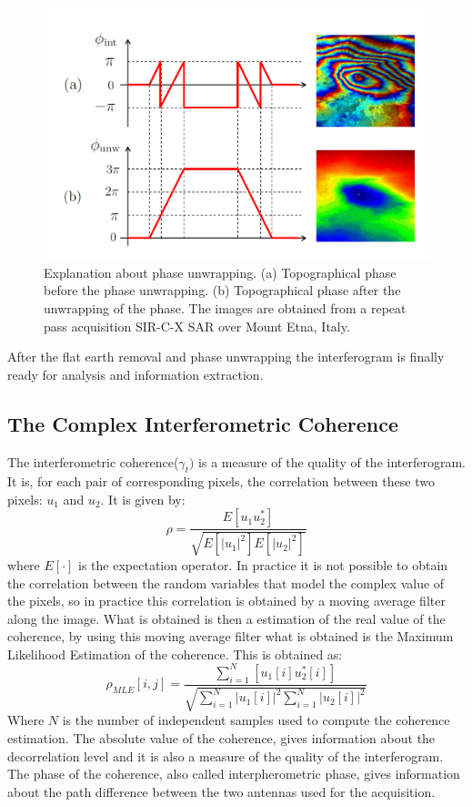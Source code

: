 \begin{figure}[H]
    \centering
    \includegraphics[width=\linewidth]{Cap1/unwr.png}
    \caption{Explanation about phase unwrapping. 
    (a) Topographical phase before the phase unwrapping.
    (b) Topographical phase after the unwrapping of the phase.
    The images are obtained from a repeat pass acquisition SIR-C-X SAR over Mount Etna, Italy. \cite{Paolathesis}}
    \label{fig:phase_unwrapping_process}
\end{figure}

After the flat earth removal and phase unwrapping the interferogram is finally ready for analysis and information extraction.

\subsection{The Complex Interferometric Coherence}
The interferometric coherence($\gamma_t)$ is a measure of the quality of the interferogram. It is, for each pair of corresponding pixels, the correlation between these two pixels: $u_1$ and $u_2$. It is given by:
\begin{equation}
    \rho = \frac{E[u_1u_2^*]}{\sqrt{E[|u_1|^2]E[|u_2|^2]}}
\end{equation}{}
where $E[\cdot]$ is the expectation operator. In practice it is not possible to obtain the correlation between the random variables that model the complex value of the pixels, so in practice this correlation is obtained by a moving average filter along the image.
What is obtained is then a estimation of the real value of the coherence, by using this moving average filter what is obtained is the Maximum Likelihood Estimation of the coherence. This is obtained as:
\begin{equation}
    \rho_{MLE}[i,j] = \frac{\sum_{i=1}^N[u_1[i]u_2^*[i]]}
    {\sqrt{\sum_{i=1}^N|u_1[i]|^2\sum_{i=1}^N|u_2[i]|^2}}
\end{equation}{}
Where $N$ is the number of independent samples used to compute the coherence estimation. 
The absolute value of the coherence, gives information about the decorrelation level and it is also a measure of the quality of the interferogram. The phase of the coherence, also called interpherometric phase, gives information about the path difference between the two antennas used for the acquisition. 

